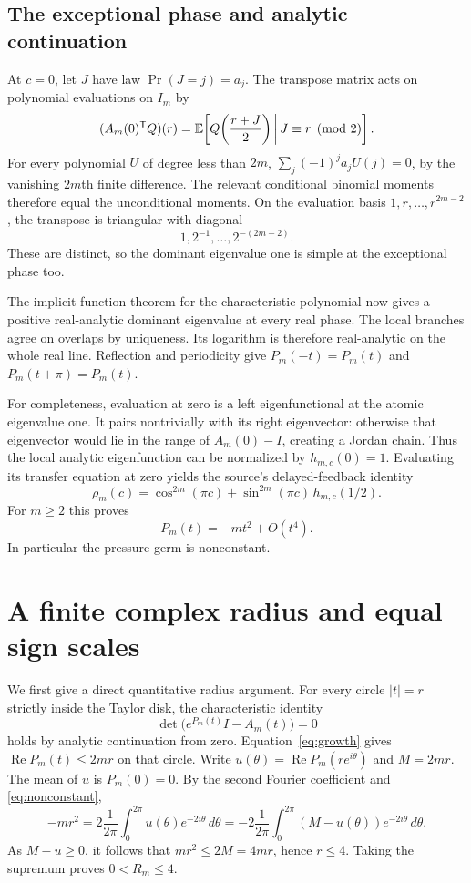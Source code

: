 \documentclass[11pt,a4paper]{article}
\theoremstyle{remark}\newtheorem*{ednote}{Editorial note (ProveIt, 2026-10-01)}
\begin{document}
\subsection{The exceptional phase and analytic continuation}
At $c=0$, let $J$ have law $\Pr(J=j)=a_j$.
The transpose matrix acts on polynomial evaluations on $I_m$ by
\[
 (A_m(0)^{\mathsf T}Q)(r)
 =\mathbb E\!\left[Q\!\left(\frac{r+J}{2}\right)\,\middle|\,J\equiv r\pmod2\right].
\]
For every polynomial $U$ of degree less than $2m$,
$\sum_j(-1)^j a_j U(j)=0$, by the vanishing $2m$th finite difference.
The relevant conditional binomial moments therefore equal the unconditional moments.
On the evaluation basis $1,r,\ldots,r^{2m-2}$, the transpose is triangular with diagonal
\[
 1,2^{-1},\ldots,2^{-(2m-2)}.
\]
These are distinct, so the dominant eigenvalue one is simple at the exceptional phase too.

The implicit-function theorem for the characteristic polynomial now gives a positive real-analytic dominant eigenvalue at every real phase.
The local branches agree on overlaps by uniqueness.
Its logarithm is therefore real-analytic on the whole real line.
Reflection and periodicity give
$P_m(-t)=P_m(t)$ and $P_m(t+\pi)=P_m(t)$.

For completeness, evaluation at zero is a left eigenfunctional at the atomic eigenvalue one. It pairs nontrivially with its right eigenvector: otherwise that eigenvector would lie in the range of $A_m(0)-I$, creating a Jordan chain.
Thus the local analytic eigenfunction can be normalized by $h_{m,c}(0)=1$.
Evaluating its transfer equation at zero yields the source's delayed-feedback identity
\[
 \rho_m(c)=\cos^{2m}(\pi c)+\sin^{2m}(\pi c)\,h_{m,c}(1/2).
\]
For $m\ge2$ this proves
\begin{equation}\label{eq:nonconstant}
 P_m(t)=-m t^2+O(t^4).
\end{equation}
In particular the pressure germ is nonconstant.

\section{A finite complex radius and equal sign scales}
We first give a direct quantitative radius argument.
For every circle $|t|=r$ strictly inside the Taylor disk, the characteristic identity
\[
 \det\bigl(e^{P_m(t)}I-A_m(t)\bigr)=0
\]
holds by analytic continuation from zero. Equation~\eqref{eq:growth} gives
$\operatorname{Re}P_m(t)\le2mr$ on that circle.
Write $u(\theta)=\operatorname{Re}P_m(re^{i\theta})$ and $M=2mr$.
The mean of $u$ is $P_m(0)=0$. By the second Fourier coefficient and \eqref{eq:nonconstant},
\[
 -mr^2=2\frac1{2\pi}\int_0^{2\pi}u(\theta)e^{-2i\theta}\,d\theta
 =-2\frac1{2\pi}\int_0^{2\pi}(M-u(\theta))e^{-2i\theta}\,d\theta .
\]
As $M-u\ge0$, it follows that $mr^2\le2M=4mr$, hence $r\le4$.
Taking the supremum proves $0<R_m\le4$.
\end{document}
